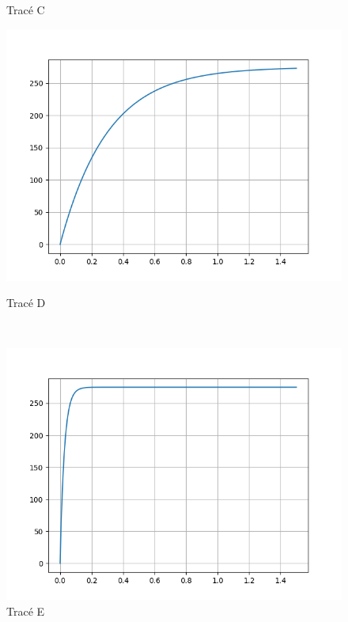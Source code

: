 \begin{figure}[ht!]
\begin{minipage}{0.47\linewidth}
 \caption{Tracé C}
 \label{img13c}
\end{minipage}\hfill
\begin{minipage}{0.47\linewidth}
\centering\includegraphics[width=0.95\linewidth]{img/fig13d}
 \caption{Tracé D}
 \label{img13d}
\end{minipage}\\
\begin{minipage}{0.47\linewidth}
\centering\includegraphics[width=0.95\linewidth]{img/fig13e}
 \caption{Tracé E}
 \label{img13e}
\end{minipage}\hfill
\begin{minipage}{0.47\linewidth}

\end{minipage}
\end{figure}

